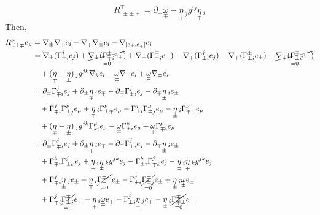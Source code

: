 \documentclass[a4paper,11pt]{article}
\numberwithin{equation}{section}
\theoremstyle{definition}
\begin{document}
\begin{equation}
    \boxed{R^\mp_{\;\pm\pm\mp}  = \partial_\mp \underset{\mp}{\omega} - \underset{\pm}{\eta}\,_jg^{ij} \underset{\mp}{\eta}\,_i }
\end{equation}
Then,
\begin{align*}
    R^\mu_{\;i\pm\mp}e_\mu &= \nabla_\pm\nabla_\mp e_i -\nabla_\mp\nabla_\pm e_i-\nabla_{[e_\pm,e_\mp]}e_i\\
    &=\nabla_\pm(\Gamma_{\mp i}^je_j)+\underset{=0}{\cancel{\nabla_\pm(\Gamma_{\mp i}^\pm e_\pm)}}+\nabla_\pm(\Gamma_{\mp i}^\mp e_\mp) -\nabla_\mp(\Gamma_{\pm i}^je_j)-\nabla_\mp(\Gamma_{\pm i}^\pm e_\pm) - \underset{=0}{\cancel{\nabla_\mp(\Gamma_{\pm i}^\mp e_\mp)}} \\
    &\quad + (\underset{\mp}{\eta}-\underset{\pm}{\eta})\,_jg^{jk}\nabla_ke_i
    - \underset{\pm}{\omega} \nabla_\pm e_i
    + \underset{\mp}{\omega} \nabla_\mp e_i\\
    &=\partial_\pm\Gamma_{\mp i}^je_j +\partial_\pm\underset{\mp}{\eta}\,_ie_\mp -\partial_\mp\Gamma_{\pm i}^je_j-\partial_\mp\underset{\pm}{\eta}\,_ie_\pm\\
    &\quad + \Gamma_{\mp i}^j\Gamma_{\pm j}^\mu e_\mu +\underset{\mp}{\eta}\,_i\Gamma_{\pm \mp}^\mu e_\mu -\Gamma_{\pm i}^j\Gamma_{\mp j}^\mu e_\mu-\underset{\pm}{\eta}\,_i\Gamma_{\mp \pm}^\mu e_\mu\\
    &\quad + (\underset{\mp}{\eta}-\underset{\pm}{\eta})\,_jg^{jk}\Gamma_{ki}^\mu e_\mu
    - \underset{\pm}{\omega} \Gamma_{\pm i}^\mu e_\mu
    + \underset{\mp}{\omega} \Gamma_{\mp i}^\mu e_\mu\\
    &=\partial_\pm\Gamma_{\mp i}^je_j +\partial_\pm\underset{\mp}{\eta}\,_ie_\mp -\partial_\mp\Gamma_{\pm i}^je_j-\partial_\mp\underset{\pm}{\eta}\,_ie_\pm\\
    &\quad + \Gamma_{\mp i}^k\Gamma_{\pm k}^j e_j +\underset{\mp}{\eta}\,_i\underset{\pm}{\eta}\,_kg^{jk} e_j -\Gamma_{\pm i}^k\Gamma_{\mp k}^j e_j-\underset{\pm}{\eta}\,_i\underset{\mp}{\eta}\,_kg^{jk} e_j\\
    &\quad + \Gamma_{\mp i}^j\underset{\pm}{\eta}\,_j e_\pm +\underset{\mp}{\eta}\,_i\underset{=0}{\cancel{\Gamma_{\pm \mp}^\pm}} e_\pm -\Gamma_{\pm i}^j\underset{=0}{\cancel{\Gamma_{\mp j}^\pm}} e_\pm+\underset{\pm}{\eta}\,_i\underset{\pm}{\omega} e_\pm\\
    &\quad + \Gamma_{\mp i}^j\underset{=0}{\cancel{\Gamma_{\pm j}^\mp}} e_\mp -\underset{\mp}{\eta}\,_i\underset{\mp}{\omega} e_\mp -\Gamma_{\pm i}^j\underset{\mp}{\eta}\,_j e_\mp-\underset{\pm}{\eta}\,_i\underset{=0}{\cancel{\Gamma_{\mp \pm}^\mp}} e_\mp\\

\end{align*}
\end{document}
